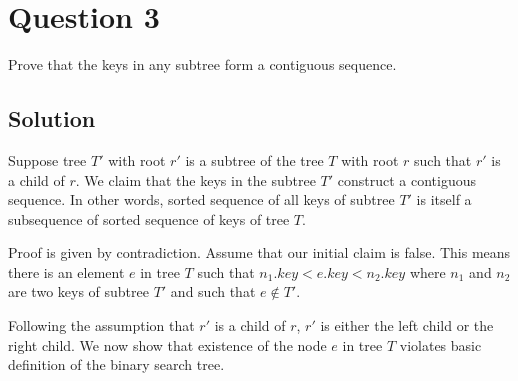 
\section*{Question 3}
Prove that the keys in any subtree form a contiguous sequence.

\subsection*{Solution}
Suppose tree $T'$ with root $r'$ is a subtree of the tree $T$ with root $r$ such that $r'$ is a child of $r$. We claim that the keys in the subtree $T'$ construct a contiguous sequence. In other words, sorted sequence of all keys of subtree $T'$ is itself a subsequence of sorted sequence of keys of tree $T$.

Proof is given by contradiction. Assume that our initial claim is false. This means there is an element $e$ in tree $T$ such that $n_1.key < e.key < n_2.key$ where $n_1$ and $n_2$ are two keys of subtree $T'$ and such that $e \notin T'$.

Following the assumption that $r'$ is a child of $r$, $r'$ is either the left child or the right child. We now show that existence of the node $e$ in tree $T$ violates basic definition of the binary search tree.

